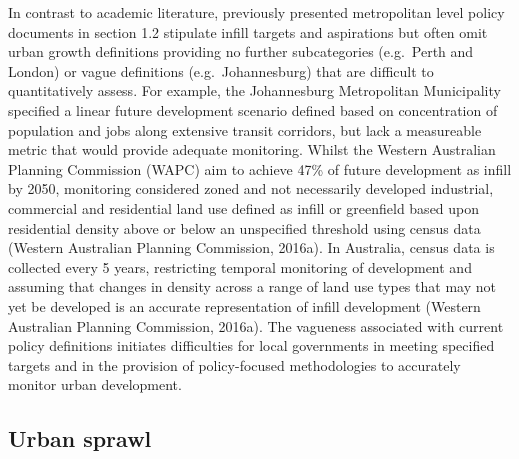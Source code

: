 \documentclass[]{book}
\begin{document}
In contrast to academic literature, previously presented metropolitan
level policy documents in section 1.2 stipulate infill targets and
aspirations but often omit urban growth definitions providing no further
subcategories (e.g.~Perth and London) or vague definitions
(e.g.~Johannesburg) that are difficult to quantitatively assess. For
example, the Johannesburg Metropolitan Municipality specified a linear
future development scenario defined based on concentration of population
and jobs along extensive transit corridors, but lack a measureable
metric that would provide adequate monitoring. Whilst the Western
Australian Planning Commission (WAPC) aim to achieve 47\% of future
development as infill by 2050, monitoring considered zoned and not
necessarily developed industrial, commercial and residential land use
defined as infill or greenfield based upon residential density above or
below an unspecified threshold using census data (Western Australian
Planning Commission, 2016a). In Australia, census data is collected
every 5 years, restricting temporal monitoring of development and
assuming that changes in density across a range of land use types that
may not yet be developed is an accurate representation of infill
development (Western Australian Planning Commission, 2016a). The
vagueness associated with current policy definitions initiates
difficulties for local governments in meeting specified targets and in
the provision of policy-focused methodologies to accurately monitor
urban development.

\subsection{Urban sprawl}\label{urban-sprawl}
\end{document}

